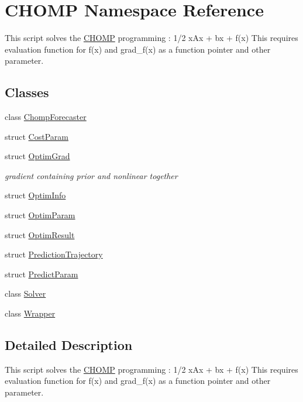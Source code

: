 \hypertarget{namespace_c_h_o_m_p}{}\section{C\+H\+O\+MP Namespace Reference}
\label{namespace_c_h_o_m_p}


This script solves the \hyperlink{namespace_c_h_o_m_p}{C\+H\+O\+MP} programming \+: 1/2 x\textquotesingle{}Ax + bx + f(x) This requires evaluation function for f(x) and grad\+\_\+f(x) as a function pointer and other parameter.  


\subsection*{Classes}
\begin{DoxyCompactItemize}
\item 
class \hyperlink{class_c_h_o_m_p_1_1_chomp_forecaster}{Chomp\+Forecaster}
\item 
struct \hyperlink{struct_c_h_o_m_p_1_1_cost_param}{Cost\+Param}
\item 
struct \hyperlink{struct_c_h_o_m_p_1_1_optim_grad}{Optim\+Grad}
\begin{DoxyCompactList}\small\item\em gradient containing prior and nonlinear together \end{DoxyCompactList}\item 
struct \hyperlink{struct_c_h_o_m_p_1_1_optim_info}{Optim\+Info}
\item 
struct \hyperlink{struct_c_h_o_m_p_1_1_optim_param}{Optim\+Param}
\item 
struct \hyperlink{struct_c_h_o_m_p_1_1_optim_result}{Optim\+Result}
\item 
struct \hyperlink{struct_c_h_o_m_p_1_1_prediction_trajectory}{Prediction\+Trajectory}
\item 
struct \hyperlink{struct_c_h_o_m_p_1_1_predict_param}{Predict\+Param}
\item 
class \hyperlink{class_c_h_o_m_p_1_1_solver}{Solver}
\item 
class \hyperlink{class_c_h_o_m_p_1_1_wrapper}{Wrapper}
\end{DoxyCompactItemize}


\subsection{Detailed Description}
This script solves the \hyperlink{namespace_c_h_o_m_p}{C\+H\+O\+MP} programming \+: 1/2 x\textquotesingle{}Ax + bx + f(x) This requires evaluation function for f(x) and grad\+\_\+f(x) as a function pointer and other parameter. 